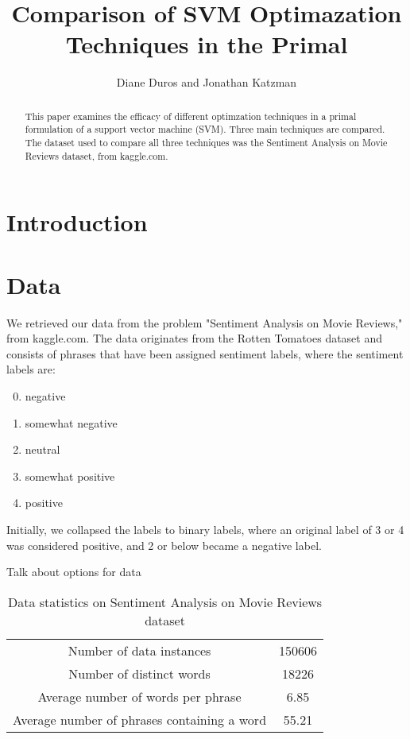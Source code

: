 \documentclass[letterpaper, 11pt]{article}
\begin{document}
\title{Comparison of SVM Optimazation Techniques in the Primal}
\author{Diane Duros and Jonathan Katzman}
\maketitle
\begin{abstract}This paper examines the efficacy of different optimzation techniques in a primal formulation of a support vector machine (SVM).  Three main techniques are compared.  The dataset used to compare all three techniques was the Sentiment Analysis on Movie Reviews dataset, from kaggle.com.
\end{abstract}
                                                                                                                                                                                                                                                                           
\section{Introduction}


\section{Data}
We retrieved our data from the problem "Sentiment Analysis on Movie Reviews," from kaggle.com.  The data originates from the Rotten Tomatoes dataset and consists of phrases that have been assigned sentiment labels, where the sentiment labels are:
\begin{enumerate}
	\setcounter{enumi}{-1}
	\item negative
	\item somewhat negative
	\item neutral
	\item somewhat positive
	\item positive
\end{enumerate}

Initially, we collapsed the labels to binary labels, where an original label of 3 or 4 was considered positive, and 2 or below became a negative label.  

Talk about options for data

\begin{table}
\centering
\caption{Data statistics on Sentiment Analysis on Movie Reviews dataset}
\label{stats}
\begin{tabular}{cc}
\hline
Number of data instances & 150606\\
Number of distinct words & 18226\\
Average number of words per phrase & 6.85\\
Average number of phrases containing a word & 55.21

\end{tabular}
\end{table}
\end{document}
